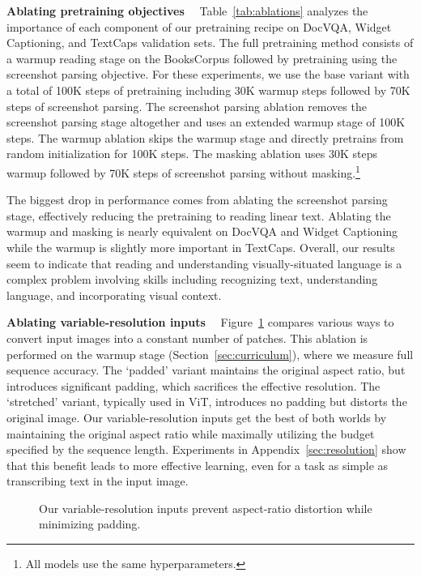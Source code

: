 \documentclass{article} %
\begin{document}
\textbf{Ablating pretraining objectives}~~
Table~\ref{tab:ablations} analyzes the importance of each component of our pretraining recipe on DocVQA, Widget Captioning, and TextCaps validation sets. The full pretraining method consists of a warmup reading stage on the BooksCorpus followed by pretraining using the screenshot parsing objective. For these experiments, we use the base variant with a total of 100K steps of pretraining including 30K warmup steps followed by 70K steps of screenshot parsing. The screenshot parsing ablation removes the screenshot parsing stage altogether and uses an extended warmup stage of 100K steps. The warmup ablation skips the warmup stage and directly pretrains from random initialization for 100K steps. The masking ablation uses 30K steps warmup followed by 70K steps of screenshot parsing without masking.\footnote{All models use the same hyperparameters.}

The biggest drop in performance comes from ablating the screenshot parsing stage, effectively reducing the pretraining to reading linear text. Ablating the warmup and masking is nearly equivalent on DocVQA and Widget Captioning while the warmup is slightly more important in TextCaps. Overall, our results seem to indicate that reading and understanding visually-situated language is a complex problem involving skills including recognizing text, understanding language, and incorporating visual context.

\textbf{Ablating variable-resolution inputs}~~
Figure~\ref{fig:aspect_ratio} compares various ways to convert input images into a constant number of patches. This ablation is performed on the warmup stage (Section~\ref{sec:curriculum}), where we measure full sequence accuracy. The `padded' variant maintains the original aspect ratio, but introduces significant padding, which sacrifices the effective resolution. The `stretched' variant, typically used in ViT, introduces no padding but distorts the original image. Our variable-resolution inputs get the best of both worlds by maintaining the original aspect ratio while maximally utilizing the budget specified by the sequence length. Experiments in Appendix~\ref{sec:resolution} show that this benefit leads to more effective learning, even for a task as simple as transcribing text in the input image.

\begin{figure}[!t]

\caption{Our variable-resolution inputs prevent aspect-ratio distortion while minimizing padding.
}
\label{fig:aspect_ratio}
\end{figure}
\end{document}
